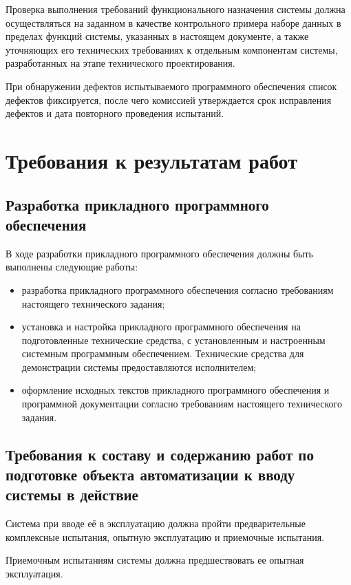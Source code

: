 \documentclass[14pt]{extreport}
\begin{document}
Проверка выполнения требований функционального назначения системы
должна осуществляться на заданном в качестве контрольного примера наборе
данных в пределах функций системы, указанных в настоящем документе, а
также уточняющих его технических требованиях к отдельным компонентам
системы, разработанных на этапе технического проектирования.

При обнаружении дефектов испытываемого программного обеспечения
список дефектов фиксируется, после чего комиссией утверждается срок
исправления дефектов и дата повторного проведения испытаний.

\section{Требования к результатам работ}

\subsection{Разработка прикладного программного обеспечения}

В ходе разработки прикладного программного обеспечения должны быть
выполнены следующие работы:
\begin{itemize}
\item разработка прикладного программного обеспечения согласно
требованиям настоящего технического задания;
\item установка и настройка прикладного программного обеспечения на
подготовленные технические средства, с установленным и настроенным
системным программным обеспечением. Технические средства для
демонстрации системы предоставляются исполнителем;
\item оформление исходных текстов прикладного программного обеспечения
и программной документации согласно требованиям настоящего
технического задания.
\end{itemize}

\subsection{Требования к составу и содержанию работ по подготовке объекта автоматизации к вводу системы в действие}

Система при вводе её в эксплуатацию должна пройти предварительные
комплексные испытания, опытную эксплуатацию и приемочные испытания.

Приемочным испытаниям системы должна предшествовать ее опытная
эксплуатация.
\end{document}
